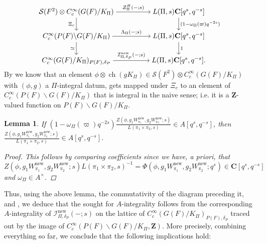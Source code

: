 \documentclass{amsart}
\theoremstyle{plain}
\newtheorem{lem}[thm]{Lemma}
\theoremstyle{plain}
\theoremstyle{remark}
\DeclareMathOperator{\ch}{ch}
\begin{document}
\[\begin{tikzcd}[ampersand replacement=\&,cramped]
	{\mathcal{S}(F^2)\otimes C_c^\infty(G(F)/K_\Pi)} \&\& {L(\Pi,s)\mathbf{C}[q^s,q^{-s}]} \\
	{C_c^\infty(P(F)\backslash G(F)/K_\Pi)} \&\& {L(\Pi,s)\mathbf{C}[q^s,q^{-s}]} \\
	{C_c^\infty(G(F)/K_\Pi)_{P(F),\delta_P}} \&\& {L(\Pi,s)\mathbf{C}[q^s,q^{-s}].}
	\arrow["{{\mathcal{Z}_\Pi^H(-;s)}}", from=1-1, to=1-3]
	\arrow["{{\Xi_c}}"', from=1-1, to=2-1]
	\arrow["{(1-\omega_\Pi(\varpi)q^{-2s})}", from=1-3, to=2-3]
	\arrow["{{\Lambda_\Pi(-;s)}}", from=2-1, to=2-3]
	\arrow["\simeq"', from=2-1, to=3-1]
	\arrow["1", from=2-3, to=3-3]
	\arrow["{\mathcal{I}_{\Pi,\delta_P}^\mathrm{new}(-;s)}", from=3-1, to=3-3]
\end{tikzcd}\]
By  we know that an element $\phi\otimes \ch(gK_\Pi)\in \mathcal{S}(F^2)\otimes C_c^\infty(G(F)/K_\Pi)$ with $(\phi,g)$ a $\Pi$-integral datum, gets mapped under $\Xi_c$ to an element of $C_c^\infty(P(F)\backslash G(F)/K_\Pi)$ that is integral in the naive sense; i.e. it is a $\mathbf{Z}$-valued function on $P(F)\backslash G(F)/K_\Pi.$
\begin{lem}
    If ${(1-\omega_\Pi(\varpi)q^{-2s})}\tfrac{Z(\phi,g_1W_{\pi_1}^\mathrm{new},g_2 W_{\pi_2}^\mathrm{new};s)}{L(\pi_1\times \pi_2,s)}\in A[q^s,q^{-s}]$, then $\tfrac{Z(\phi,g_1W_{\pi_1}^\mathrm{new},g_2 W_{\pi_2}^\mathrm{new};s)}{L(\pi_1\times \pi_2,s)}\in A[q^s,q^{-s}]$.
    \begin{proof}
        This follows by comparing coefficients since we have, a priori, that $$Z(\phi,g_1W_{\pi_1}^\mathrm{new},g_2 W_{\pi_2}^\mathrm{new};s)L(\pi_1\times \pi_2,s)^{-1}=\Phi(\phi,g_1W_{\pi_1}^\mathrm{new},g_2 W_{\pi_2}^\mathrm{new};q^s)\in \mathbf{C}[q^s,q^{-s}]$$ and $\omega_\Pi\in A^\times$.
    \end{proof}
\end{lem}
\noindent Thus, using the above lemma, the commutativity of the diagram preceding it, and , we deduce that the sought for $A$-integrality follows from the corresponding $A$-integrality of $\mathcal{I}_{\Pi,\delta_P}^\mathrm{new}(-;s)$ on the lattice of $C_c^\infty(G(F)/K_\Pi)_{P(F),\delta_P}$ traced out by the image of $C_c^\infty(P(F)\backslash G(F)/K_\Pi,\mathbf{Z})$. More precisely, combining everything so far, we conclude that the following implications hold:
\end{document}
